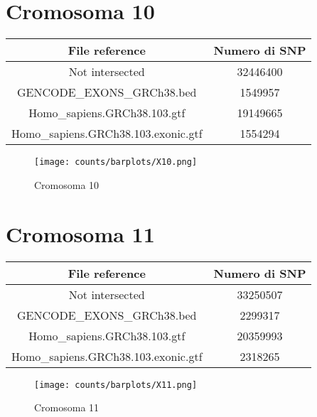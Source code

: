 \section*{Cromosoma 10}
  \begin{table}[H]\centering
	\begin{tabular}{|c|c|}
	  \hline
	  File reference & Numero di SNP \\
		\hline
		Not intersected & 32446400 \\
	  \hline
	  GENCODE\_EXONS\_GRCh38.bed & 1549957 \\
	  \hline
	  Homo\_sapiens.GRCh38.103.gtf &19149665 \\
	  \hline
	  Homo\_sapiens.GRCh38.103.exonic.gtf & 1554294 \\
	  \hline
	\end{tabular}
  \end{table}
  \begin{figure}[H]
	\texttt{[image: counts/barplots/X10.png]}
	\caption{Cromosoma 10}
	\label{fig:chr10}
  \end{figure}

\section*{Cromosoma 11}
  \begin{table}[H]\centering
	\begin{tabular}{|c|c|}
	  \hline
	  File reference & Numero di SNP \\
		\hline
		Not intersected & 33250507 \\
	  \hline
	  GENCODE\_EXONS\_GRCh38.bed & 2299317 \\
	  \hline
	  Homo\_sapiens.GRCh38.103.gtf & 20359993 \\
	  \hline
	  Homo\_sapiens.GRCh38.103.exonic.gtf & 2318265 \\
	  \hline
	\end{tabular}
  \end{table}
  \begin{figure}[H]
	\texttt{[image: counts/barplots/X11.png]}
	\caption{Cromosoma 11}
	\label{fig:chr11}
  \end{figure}

